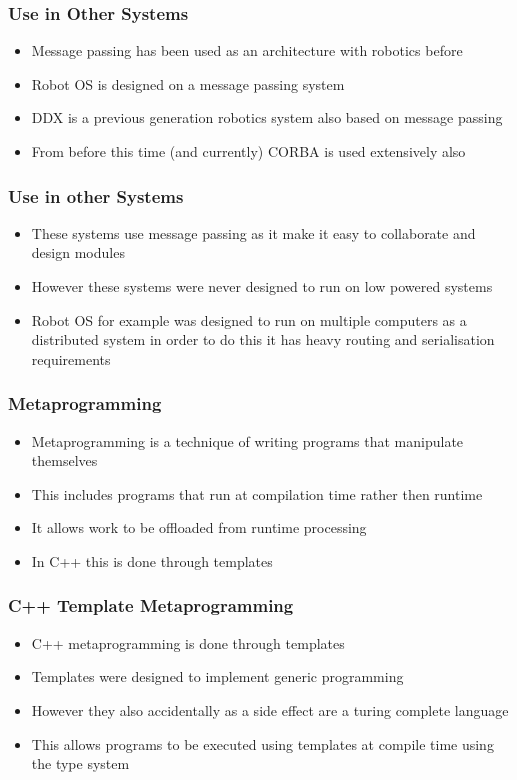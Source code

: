 \documentclass{beamer}
\begin{document}
	\begin{frame}
		\frametitle{Use in Other Systems}
		\begin{itemize}
		\item Message passing has been used as an architecture with robotics before
			\item Robot OS is designed on a message passing system
			\item DDX is a previous generation robotics system also based on message passing
			\item From before this time (and currently) CORBA is used extensively also
		\end{itemize}
	\end{frame}
	
	\begin{frame}
		\frametitle{Use in other Systems}
		\begin{itemize}
			\item These systems use message passing as it make it easy to collaborate and design modules
			\item However these systems were never designed to run on low powered systems
			\item Robot OS for example was designed to run on multiple computers as a distributed system in order to do this it has heavy routing and serialisation requirements
		\end{itemize}
	\end{frame}
	
	\begin{frame}
		\frametitle{Metaprogramming}
		\begin{itemize}
			\item Metaprogramming is a technique of writing programs that manipulate themselves
			\item This includes programs that run at compilation time rather then runtime
			\item It allows work to be offloaded from runtime processing
			\item In C++ this is done through templates
		\end{itemize}
	\end{frame}
	
	\begin{frame}
		\frametitle{C++ Template Metaprogramming}
		\begin{itemize}
			\item C++ metaprogramming is done through templates
			\item Templates were designed to implement generic programming
			\item However they also accidentally as a side effect are a turing complete language
			\item This allows programs to be executed using templates at compile time using the type system
		\end{itemize}
	\end{frame}
		
\end{document}
